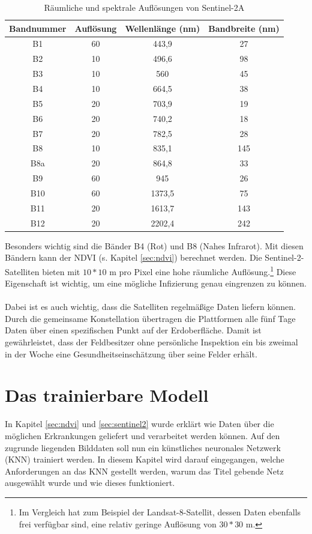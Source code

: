 \begin{table}[ht]
\centering
\begin{tabular}{c|c|c|c}
Bandnummer & Auflösung & Wellenlänge (nm) & Bandbreite (nm) \\
\hline
B1 & 60 & 443,9 & 27\\
B2 & 10 & 496,6 & 98\\
B3 & 10 & 560 & 45\\
B4 & 10 & 664,5 & 38\\
B5 & 20 & 703,9 & 19\\
B6 & 20 & 740,2 & 18\\
B7 & 20 & 782,5 & 28\\
B8 & 10 & 835,1 & 145\\
B8a & 20 & 864,8 & 33\\
B9 & 60 & 945 & 26\\
B10 & 60 & 1373,5 & 75\\
B11 & 20 & 1613,7 & 143\\
B12 & 20 & 2202,4 & 242\\
\end{tabular}
\caption{Räumliche und spektrale Auflösungen von Sentinel-2A\cite{ref:sentinel:radiores}}\label{tab:resolutions}
\end{table}
\noindent
Besonders wichtig sind die Bänder B4 (Rot) und B8 (Nahes Infrarot). Mit diesen Bändern kann der NDVI (s. Kapitel \ref{sec:ndvi}) berechnet werden.\cite{ref:sentinel:ndvi} Die Sentinel-2-Satelliten bieten mit $10*10$ m pro Pixel eine hohe räumliche Auflösung.\footnote{Im Vergleich hat zum Beispiel der Landsat-8-Satellit, dessen Daten ebenfalls frei verfügbar sind, eine relativ geringe Auflösung von $30*30$ m.\cite{ref:landsat}} Diese Eigenschaft ist wichtig, um eine mögliche Infizierung genau eingrenzen zu können.\\\\
Dabei ist es auch wichtig, dass die Satelliten regelmäßige Daten liefern können. Durch die gemeinsame Konstellation übertragen die Plattformen alle fünf Tage Daten über einen spezifischen Punkt auf der Erdoberfläche.\cite{ref:sentinel:resolutions} Damit ist gewährleistet, dass der Feldbesitzer ohne persönliche Inspektion ein bis zweimal in der Woche eine Gesundheitseinschätzung über seine Felder erhält.

\section{Das trainierbare Modell}\label{sec:maskrcnn}
In Kapitel \ref{sec:ndvi} und \ref{sec:sentinel2} wurde erklärt wie Daten über die möglichen Erkrankungen geliefert und verarbeitet werden können. Auf den zugrunde liegenden Bilddaten soll nun ein künstliches neuronales Netzwerk (KNN) trainiert werden. In diesem Kapitel wird darauf eingegangen, welche Anforderungen an das KNN gestellt werden, warum das Titel gebende Netz ausgewählt wurde und wie dieses funktioniert.

